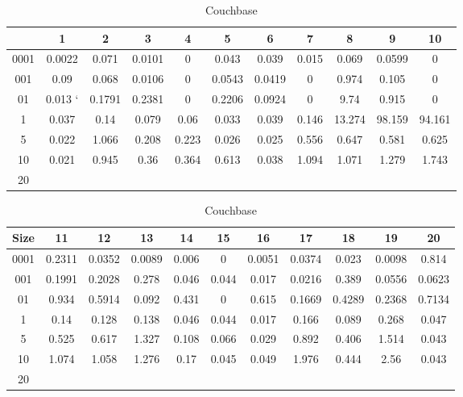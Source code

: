 \begin{center}
\begin{table} [ht]
\tiny
\caption{Couchbase}
\label{couchbase-query-result-table}
\begin{tabular}{|c|c|c|c|c|c|c|c|c|c|c| } 
    &  1 & 2 & 3 & 4 & 5 & 6 & 7 & 8 & 9 & 10 \\
 \hline
0001 & 0.0022 & 0.071 & 0.0101 & 0 & 0.043 & 0.039 & 0.015 & 0.069 & 0.0599 & 0	\\
001 & 0.09 & 0.068 & 0.0106 & 0 & 0.0543 & 0.0419 & 0 & 0.974 & 0.105 & 0	\\
01 & 0.013 `& 0.1791 & 0.2381 & 0 & 0.2206 & 0.0924 & 0 & 9.74 & 0.915 & 0	\\
1 & 0.037 & 0.14 & 0.079 & 0.06 & 0.033 & 0.039 & 0.146 & 13.274 & 98.159 & 94.161	\\
5 & 0.022 & 1.066 & 0.208 & 0.223 & 0.026 & 0.025 & 0.556 & 0.647 & 0.581 & 0.625	\\
10 & 0.021 & 0.945 & 0.36 & 0.364 & 0.613 & 0.038 & 1.094 & 1.071 & 1.279 & 1.743	\\
20 &  &  &  &  &  &  &  &  &  & 	\\

\end{tabular}
\begin{tabular}{|c|c|c|c|c|c|c|c|c|c|c| } 
Size & 11 & 12 & 13 & 14 & 15 & 16 & 17 & 18 & 19 & 20	\\
\hline
0001 & 0.2311 & 0.0352 & 0.0089 & 0.006 & 0 & 0.0051 & 0.0374 & 0.023 & 0.0098 & 0.814	\\
001 & 0.1991 & 0.2028 & 0.278 & 0.046 & 0.044 & 0.017 & 0.0216 & 0.389 & 0.0556 & 0.0623	\\
01 & 0.934 & 0.5914 & 0.092 & 0.431 & 0 & 0.615 & 0.1669 & 0.4289 & 0.2368 & 0.7134	\\
1 & 0.14 & 0.128 & 0.138 & 0.046 & 0.044 & 0.017 & 0.166 & 0.089 & 0.268 & 0.047	\\
5 & 0.525 & 0.617 & 1.327 & 0.108 & 0.066 & 0.029 & 0.892 & 0.406 & 1.514 & 0.043	\\
10 & 1.074 & 1.058 & 1.276 & 0.17 & 0.045 & 0.049 & 1.976 & 0.444 & 2.56 & 0.043	\\
20 &  &  &  &  &  &  &  &  &  & 	\\


\end{tabular}
\end{table}

\end{center}

